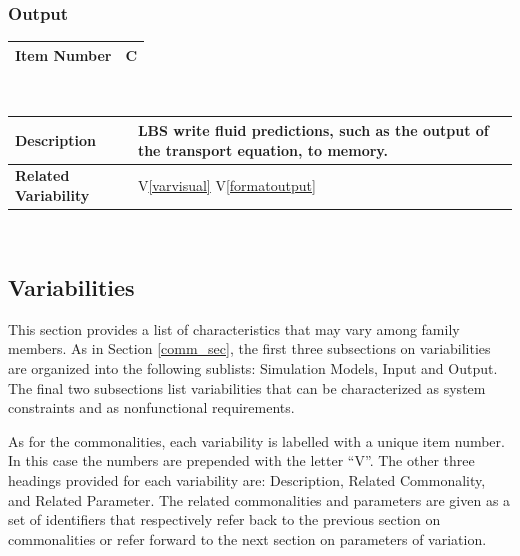 \documentclass[12pt, notitlepage]{article}
\newcommand{\colAwidth}{0.24\textwidth}
\newcommand{\colBwidth}{0.76\textwidth}
\newcounter{comnum} %
\newcommand{\vref}[1]{V\ref{#1}}
\begin{document}
\subsubsection{Output}\label{comm_out}
\noindent
\begin{minipage}{\textwidth}
	\renewcommand*{\arraystretch}{1.5}
	\begin{tabular}{| p{\colAwidth} | p{\colBwidth}|}
		\hline
		\bf Item Number& C{comnum}\thecomnum\label{predictionstomemory} \\
		\hline
	\end{tabular}\\
	
	\begin{tabular}{| p{\colAwidth} | p{\colBwidth}|}		
		\hline
		\bf Description & LBS write fluid predictions, such as the output of the transport equation, to memory.\\
		\hline
		\bf Related Variability & \vref{varvisual} \vref{formatoutput} \\
		\hline
	\end{tabular}
\end{minipage}\\
\subsection{Variabilities}\label{var_sec}
This section provides a list of characteristics that may vary among family members. As in Section \ref{comm_sec}, the first three subsections on variabilities are organized into the following sublists: Simulation Models, Input and Output. The final two subsections list variabilities that can be characterized as system constraints and as nonfunctional requirements. 

As for the commonalities, each variability is labelled with a unique item number. In this case the numbers are prepended with the letter ``V''. The other three headings provided for each variability are: Description, Related Commonality, and Related Parameter. The related commonalities and parameters are given as a set of identifiers that respectively refer back to the previous section on commonalities or refer forward to the next section on parameters of variation.
\end{document}
